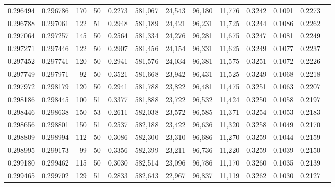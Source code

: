 \begin{tabular}{rrrrrrrrrrrrr}
0.296494 & 0.296786 &   170 &  50 &                                     0.2273 & 581,067 &  24,543 &  96,180 &  11,776 & 0.3242 & 0.1091 & 0.2273 \\
0.296788 & 0.297061 &   122 &  51 &                                     0.2948 & 581,189 &  24,421 &  96,231 &  11,725 & 0.3244 & 0.1086 & 0.2262 \\
0.297064 & 0.297257 &   145 &  50 &                                     0.2564 & 581,334 &  24,276 &  96,281 &  11,675 & 0.3247 & 0.1081 & 0.2249 \\
0.297271 & 0.297446 &   122 &  50 &                                     0.2907 & 581,456 &  24,154 &  96,331 &  11,625 & 0.3249 & 0.1077 & 0.2237 \\
0.297452 & 0.297741 &   120 &  50 &                                     0.2941 & 581,576 &  24,034 &  96,381 &  11,575 & 0.3251 & 0.1072 & 0.2226 \\
0.297749 & 0.297971 &    92 &  50 &                                     0.3521 & 581,668 &  23,942 &  96,431 &  11,525 & 0.3249 & 0.1068 & 0.2218 \\
0.297972 & 0.298179 &   120 &  50 &                                     0.2941 & 581,788 &  23,822 &  96,481 &  11,475 & 0.3251 & 0.1063 & 0.2207 \\
0.298186 & 0.298445 &   100 &  51 &                                     0.3377 & 581,888 &  23,722 &  96,532 &  11,424 & 0.3250 & 0.1058 & 0.2197 \\
0.298446 & 0.298638 &   150 &  53 &                                     0.2611 & 582,038 &  23,572 &  96,585 &  11,371 & 0.3254 & 0.1053 & 0.2183 \\
0.298656 & 0.298801 &   150 &  51 &                                     0.2537 & 582,188 &  23,422 &  96,636 &  11,320 & 0.3258 & 0.1049 & 0.2170 \\
0.298809 & 0.298994 &   112 &  50 &                                     0.3086 & 582,300 &  23,310 &  96,686 &  11,270 & 0.3259 & 0.1044 & 0.2159 \\
0.298995 & 0.299173 &    99 &  50 &                                     0.3356 & 582,399 &  23,211 &  96,736 &  11,220 & 0.3259 & 0.1039 & 0.2150 \\
0.299180 & 0.299462 &   115 &  50 &                                     0.3030 & 582,514 &  23,096 &  96,786 &  11,170 & 0.3260 & 0.1035 & 0.2139 \\
0.299465 & 0.299702 &   129 &  51 &                                     0.2833 & 582,643 &  22,967 &  96,837 &  11,119 & 0.3262 & 0.1030 & 0.2127 \\

\end{tabular}
